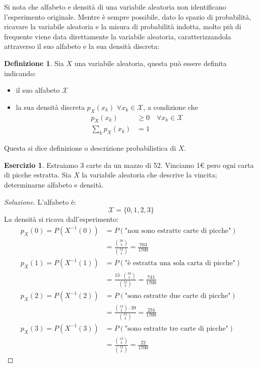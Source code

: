 \documentclass{article}
\theoremstyle{plain}
\theoremstyle{definition}
\newtheorem{definizione}{Definizione}[section]
\newtheorem{esercizio}{Esercizio}[section]
\theoremstyle{remark}
\newenvironment{soluzione}
	{\renewcommand\qedsymbol{$\mathwitch*$}\begin{proof}[Soluzione]}
	{\end{proof}}
\renewcommand{\qedsymbol}{$\mathrightghost$}
\begin{document}
Si nota che alfabeto e densità di una variabile aleatoria non identificano l'esperimento originale. Mentre è sempre possibile, dato lo spazio di probabilità, ricavare la variabile aleatoria e la misura di probabilità indotta, molto più di frequente viene data direttamente la variabile aleatoria, caratterizzandola attraverso il suo alfabeto e la sua densità discreta:
\begin{definizione}
	Sia $X$ una variabile aleatoria, questa può essere definita indicando:
	\begin{itemize}
		\item il suo alfabeto $\mathcal{X}$
		\item la sua densità discreta $p_X(x_k)$ $\forall x_k\in\mathcal{X}$, a condizione che
		\begin{align*}
			p_X(x_k)&\geq0\quad\forall x_k\in\mathcal{X}\\
			\sum_k p_X(x_k)&=1
		\end{align*}
	\end{itemize}
	Questa si dice definizione o descrizione probabilistica di $X$.
\end{definizione}
\begin{esercizio}
	Estraiamo 3 carte da un mazzo di 52. Vinciamo 1€ pero ogni carta di picche estratta. Sia $X$ la variabile aleatoria che descrive la vincita; determinarne alfabeto e densità.
	\begin{soluzione}
		L'alfabeto è:
		\begin{equation*}
			\mathcal{X}=\{0,1,2,3\}
		\end{equation*}
		La densità si ricava dall'esperimento:
		\begin{align*}
			p_X(0)=P(X^{-1}(0))&=P(\text{"non sono estratte carte di picche"})\\
			&=\frac{\binom{39}{3}}{\binom{52}{3}}=\frac{703}{1700}\\
			p_X(1)=P(X^{-1}(1))&=P(\text{"è estratta una sola carta di picche"})\\
			&=\frac{13\cdot\binom{39}{2}}{\binom{52}{3}}=\frac{741}{1700}\\
			p_X(2)=P(X^{-1}(2))&=P(\text{"sono estratte due carte di picche"})\\
			&=\frac{\binom{13}{2}\cdot39}{\binom{52}{3}}=\frac{234}{1700}\\
			p_X(3)=P(X^{-1}(3))&=P(\text{"sono estratte tre carte di picche"})\\
			&=\frac{\binom{13}{3}}{\binom{52}{3}}=\frac{22}{1700}
		\end{align*}
	\end{soluzione}
\end{esercizio}
\end{document}
